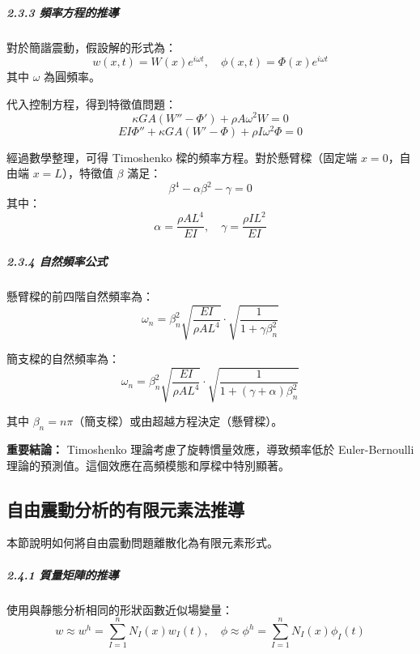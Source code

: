 \documentclass[UTF8, a4paper, 12pt]{ctexart}
\begin{document}
\subparagraph{2.3.3 頻率方程的推導}

對於簡諧震動，假設解的形式為：
\begin{equation}
  w(x,t) = W(x) e^{i\omega t}, \quad \phi(x,t) = \Phi(x) e^{i\omega t}
\end{equation}
其中 $\omega$ 為圓頻率。

代入控制方程，得到特徵值問題：
\begin{equation}
  \kappa GA \left( W'' - \Phi' \right) + \rho A \omega^2 W = 0
\end{equation}
\begin{equation}
  EI \Phi'' + \kappa GA (W' - \Phi) + \rho I \omega^2 \Phi = 0
\end{equation}

經過數學整理，可得 Timoshenko 樑的頻率方程。對於懸臂樑（固定端 $x=0$，自由端 $x=L$），特徵值 $\beta$ 滿足：
\begin{equation}
  \beta^4 - \alpha \beta^2 - \gamma = 0
\end{equation}
其中：
\begin{equation}
  \alpha = \frac{\rho A L^4}{EI}, \quad \gamma = \frac{\rho I L^2}{EI}
\end{equation}

\subparagraph{2.3.4 自然頻率公式}

懸臂樑的前四階自然頻率為：
\begin{equation}
  \omega_n = \beta_n^2 \sqrt{\frac{EI}{\rho A L^4}} \cdot \sqrt{\frac{1}{1 + \gamma \beta_n^2}}
\end{equation}

簡支樑的自然頻率為：
\begin{equation}
  \omega_n = \beta_n^2 \sqrt{\frac{EI}{\rho A L^4}} \cdot \sqrt{\frac{1}{1 + (\gamma + \alpha)\beta_n^2}}
\end{equation}

其中 $\beta_n = n\pi$（簡支樑）或由超越方程決定（懸臂樑）。

\textbf{重要結論：} Timoshenko 理論考慮了旋轉慣量效應，導致頻率低於 Euler-Bernoulli 理論的預測值。這個效應在高頻模態和厚樑中特別顯著。

\subsection{自由震動分析的有限元素法推導}

本節說明如何將自由震動問題離散化為有限元素形式。

\subparagraph{2.4.1 質量矩陣的推導}

使用與靜態分析相同的形狀函數近似場變量：
\begin{equation}
  w \approx w^h = \sum_{I=1}^{n} N_I(x) w_I(t), \quad \phi \approx \phi^h = \sum_{I=1}^{n} N_I(x) \phi_I(t)
\end{equation}
\end{document}

